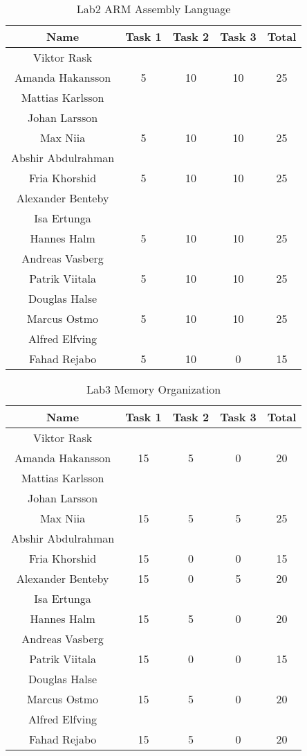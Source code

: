 \documentclass{article}
\begin{document}
\begin{table}[ht]
\caption{Lab2 ARM Assembly Language}
\centering 
\begin{tabular}{c c c c c} 
\hline\hline 
Name & Task 1 & Task 2 & Task 3 & Total \\ [0.5ex] 
\hline
Viktor Rask \\ Amanda Hakansson 
& 5 & 10 & 10 & 25 \\
\hline 
Mattias Karlsson \\ Johan Larsson \\ Max Niia 
& 5 & 10 & 10 & 25 \\
\hline 
Abshir Abdulrahman \\ Fria Khorshid 
& 5 & 10 & 10 & 25 \\
\hline 
Alexander Benteby \\ Isa Ertunga \\ Hannes Halm 
& 5 & 10 & 10 & 25 \\
\hline
Andreas Vasberg \\ Patrik Viitala
& 5 & 10 & 10 & 25 \\ 
\hline
Douglas Halse \\ Marcus Ostmo
& 5 & 10 & 10 & 25 \\ 
\hline
Alfred Elfving \\ Fahad Rejabo
& 5 & 10 & 0 & 15 \\
\hline
\end{tabular}
\label{table:nonlin}
\end{table}
 

\begin{table}[ht]
\caption{Lab3 Memory Organization}
\centering 
\begin{tabular}{c c c c c} 
\hline\hline 
Name & Task 1 & Task 2 & Task 3 & Total \\ [0.5ex] 
\hline
Viktor Rask \\ Amanda Hakansson 
& 15 & 5 & 0 & 20 \\
\hline 
Mattias Karlsson \\ Johan Larsson \\ Max Niia 
& 15 & 5 & 5 & 25 \\
\hline 
Abshir Abdulrahman \\ Fria Khorshid 
& 15 & 0 & 0 & 15 \\
\hline 
Alexander Benteby 
& 15 & 0 & 5 & 20 \\
\hline
Isa Ertunga \\ Hannes Halm 
& 15 & 5 & 0 & 20 \\
\hline
Andreas Vasberg \\ Patrik Viitala
& 15 & 0 & 0 & 15 \\ 
\hline
Douglas Halse \\ Marcus Ostmo
& 15 & 5 & 0 & 20 \\ 
\hline
Alfred Elfving \\ Fahad Rejabo
& 15 & 5 & 0 & 20 \\
\hline
\end{tabular}
\label{table:nonlin}
\end{table}
\end{document}
